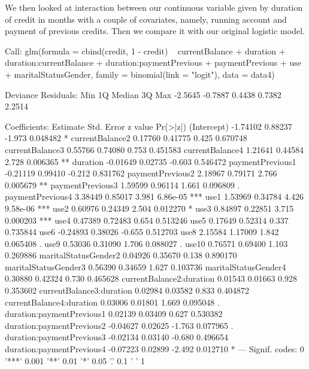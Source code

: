 \documentclass{article}
\begin{document}
We then looked at interaction between our continuous variable given by duration of credit in months with a couple of covariates, namely, running account and payment of previous credits. Then we compare it with our original logistic model.\\
\begin{Schunk}
\begin{Soutput}
Call:
glm(formula = cbind(credit, 1 - credit) ~ currentBalance + duration + 
    duration:currentBalance + duration:paymentPrevious + paymentPrevious + 
    use + maritalStatusGender, family = binomial(link = "logit"), 
    data = data4)

Deviance Residuals: 
    Min       1Q   Median       3Q      Max  
-2.5645  -0.7887   0.4438   0.7382   2.2514  

Coefficients:
                          Estimate Std. Error z value Pr(>|z|)    
(Intercept)               -1.74102    0.88237  -1.973 0.048482 *  
currentBalance2            0.17760    0.41775   0.425 0.670748    
currentBalance3            0.55766    0.74080   0.753 0.451583    
currentBalance4            1.21641    0.44584   2.728 0.006365 ** 
duration                  -0.01649    0.02735  -0.603 0.546472    
paymentPrevious1          -0.21119    0.99410  -0.212 0.831762    
paymentPrevious2           2.18967    0.79171   2.766 0.005679 ** 
paymentPrevious3           1.59599    0.96114   1.661 0.096809 .  
paymentPrevious4           3.38449    0.85017   3.981 6.86e-05 ***
use1                       1.53969    0.34784   4.426 9.58e-06 ***
use2                       0.60976    0.24349   2.504 0.012270 *  
use3                       0.84897    0.22851   3.715 0.000203 ***
use4                       0.47389    0.72483   0.654 0.513246    
use5                       0.17649    0.52314   0.337 0.735844    
use6                      -0.24893    0.38026  -0.655 0.512703    
use8                       2.15584    1.17009   1.842 0.065408 .  
use9                       0.53036    0.31090   1.706 0.088027 .  
use10                      0.76571    0.69400   1.103 0.269886    
maritalStatusGender2       0.04926    0.35670   0.138 0.890170    
maritalStatusGender3       0.56390    0.34659   1.627 0.103736    
maritalStatusGender4       0.30880    0.42324   0.730 0.465628    
currentBalance2:duration   0.01543    0.01663   0.928 0.353602    
currentBalance3:duration   0.02984    0.03582   0.833 0.404872    
currentBalance4:duration   0.03006    0.01801   1.669 0.095048 .  
duration:paymentPrevious1  0.02139    0.03409   0.627 0.530382    
duration:paymentPrevious2 -0.04627    0.02625  -1.763 0.077965 .  
duration:paymentPrevious3 -0.02134    0.03140  -0.680 0.496654    
duration:paymentPrevious4 -0.07223    0.02899  -2.492 0.012710 *  
---
Signif. codes:  0 '***' 0.001 '**' 0.01 '*' 0.05 '.' 0.1 ' ' 1


\end{Soutput}
\end{Schunk}
\end{document}
